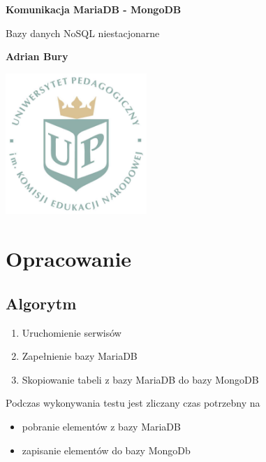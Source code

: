 \documentclass[12pt,oneside,a4paper]{book}
\begin{document}
    \begin{titlepage}

        \begin{center}
            \vspace*{1cm}

            \large{
                \textbf{Komunikacja MariaDB - MongoDB}
            }

            \vspace{0.5cm}
            Bazy danych NoSQL
            \linebreak
            niestacjonarne

            \vspace{1.5cm}

            \textbf{Adrian Bury}

            \vfill

            \includegraphics[width=0.4\textwidth]{images/logoup.jpg}

        \end{center}
    \end{titlepage}

    \chapter*{Opracowanie}


    \section*{Algorytm}

    \begin{enumerate}
        \item Uruchomienie serwisów
        \item Zapełnienie bazy MariaDB
        \item Skopiowanie tabeli z bazy MariaDB do bazy MongoDB
    \end{enumerate}

    \noindent
    Podczas wykonywania testu jest zliczany czas potrzebny na
    \begin{itemize}
        \item pobranie elementów z bazy MariaDB
        \item zapisanie elementów do bazy MongoDb
    \end{itemize}
\end{document}
